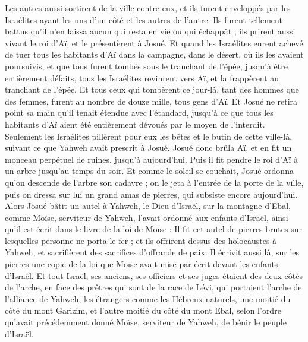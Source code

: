 \begin{multicols}{2}
Les autres aussi sortirent de la ville contre eux, et ils furent enveloppés par les Israélites ayant les uns d'un côté et les autres de l'autre. Ils furent tellement battus qu'il n'en laissa aucun qui resta en vie ou qui échappât ;
ils prirent aussi vivant le roi d'Aï, et le présentèrent à Josué.
Et quand les Israélites eurent achevé de tuer tous les habitants d'Aï dans la campagne, dans le désert, où ils les avaient poursuivis, et que tous furent tombés sous le tranchant de l'épée, jusqu'à être entièrement défaits, tous les Israélites revinrent vers Aï, et la frappèrent au tranchant de l'épée.
Et tous ceux qui tombèrent ce jour-là, tant des hommes que des femmes, furent au nombre de douze mille, tous gens d'Aï.
Et Josué ne retira point sa main qu'il tenait étendue avec l'étandard, jusqu'à ce que tous les habitants d'Aï aient été entièrement dévoués par le moyen de l'interdit.
Seulement les Israélites pillèrent pour eux les bêtes et le butin de cette ville-là, suivant ce que Yahweh avait prescrit à Josué.
Josué donc brûla Aï, et en fit un monceau perpétuel de ruines, jusqu'à aujourd'hui.
Puis il fit pendre le roi d'Aï à un arbre jusqu'au temps du soir. Et comme le soleil se couchait, Josué ordonna qu'on descende de l'arbre son cadavre ; on le jeta à l'entrée de la porte de la ville, puis on dressa sur lui un grand amas de pierres, qui subsiste encore aujourd'hui.
Alors Josué bâtit un autel à Yahweh, le Dieu d'Israël, sur la montagne d'Ebal,
comme Moïse, serviteur de Yahweh, l'avait ordonné aux enfants d'Israël, ainsi qu'il est écrit dans le livre de la loi de Moïse : Il fit cet autel de pierres brutes sur lesquelles personne ne porta le fer ; et ils offrirent dessus des holocaustes à Yahweh, et sacrifièrent des sacrifices d'offrande de paix.
Il écrivit aussi là, sur les pierres une copie de la loi que Moïse avait mise par écrit devant les enfants d'Israël.
Et tout Israël, ses anciens, ses officiers et ses juges étaient des deux côtés de l'arche, en face des prêtres qui sont de la race de Lévi, qui portaient l'arche de l'alliance de Yahweh, les étrangers comme les Hébreux naturels, une moitié du côté du mont Garizim, et l'autre moitié du côté du mont Ebal, selon l'ordre qu'avait précédemment donné Moïse, serviteur de Yahweh, de bénir le peuple d'Israël.

\end{multicols}
